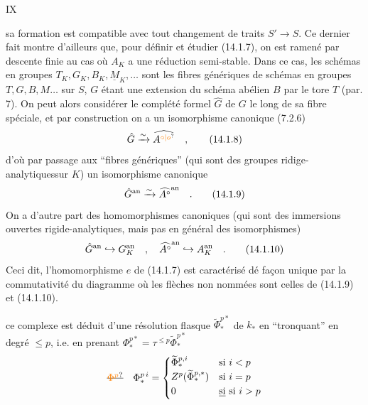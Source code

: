 
\hfill IX

sa formation est compatible avec tout changement de traits $S'\longrightarrow S$. Ce dernier fait montre d'ailleurs que, pour définir et étudier (14.1.7), on est ramené par descente finie au cas où $A_K$ a une réduction semi-stable. Dans ce cas, les schémas en groupes $T_K,G_K,B_K,\underline M_K,\ldots$ sont les fibres génériques de schémas en groupes $T,G,B,M\ldots$ sur $S$, $G$ étant une extension du schéma abélien $B$ par le tore $T$ (par. 7). On peut alors considérer le complété formel $\hat G$ de $G$ le long de sa fibre spéciale, et par construction on a un isomorphisme canonique (7.2.6)
\[
 \hat G\xrightarrow{\sim}\handwritten{\widehat}{A^{\unsure{\circ|o}}}\quad, \tag*{(14.1.8)}
\]
d'où par passage aux ``fibres génériques'' (qui sont des groupes ridige-analytiquessur $K$) un isomorphisme canonique
\[
 \hat G^{\mathrm{an}}\xrightarrow{\sim}\widehat{A^\circ}^{\mathrm{an}}\quad. \tag*{(14.1.9)}
\]
On a d'autre part des homomorphismes canoniques (qui sont des immersions ouvertes rigide-analytiques, mais pas en général des isomorphismes)
\[
 \hat G^{\mathrm{an}}\hookrightarrow G_K^{\mathrm{an}}\quad,\quad
 \widehat{A^\circ}^{\mathrm{an}}\hookrightarrow A_K^{\mathrm{an}}\quad. \tag*{(14.1.10)}
\]
Ceci dit, l'homomorphisme $e$ de (14.1.7) est caractérisé dé façon unique par la commutativité du diagramme
où les flèches non nommées sont celles de (14.1.9) et (14.1.10).



ce complexe est déduit d'une résolution flasque $\widetilde\Phi_*^{p*}$ de \deleted{\unsure{$\Phi$}} $k_*$ en  ``tronquant'' en  degré $\leq p$, i.e. en prenant $\Phi_*^{p*}=\tau^{\leq p}\widetilde\Phi_*^{p*}$
\[
 \deleted{\unsure{\Phi^p}}\quad\Phi_*^{p\,i}=
 \begin{cases}\widetilde\Phi_*^{p,i}&\text{si }i<p\\
 Z^p(\widetilde\Phi_*^{p,*})&\text{si }i=p\\
 0&\deleted{\text{si}}\text{ si }i>p\end{cases}
\]

